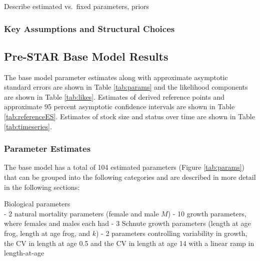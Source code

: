 \documentclass[11pt,
  english,
  a4paper,
]{article}
\begin{document}
\leavevmode\tagmcend\tagstructend

Describe estimated vs.~fixed parameters, priors


\hypertarget{key-assumptions-and-structural-choices}{%
\subsubsection{Key Assumptions and Structural Choices}\label{key-assumptions-and-structural-choices}}

\leavevmode\tagmcend\tagstructend


\hypertarget{pre-star-base-model-results}{%
\subsection{Pre-STAR Base Model Results}\label{pre-star-base-model-results}}

\leavevmode\tagmcend\tagstructend

The base model parameter estimates along with approximate asymptotic standard errors are shown in Table \ref{tab:params} and the likelihood components are shown in Table \ref{tab:likes}. Estimates of derived reference points and approximate 95 percent asymptotic confidence intervals are shown in Table \ref{tab:referenceES}. Estimates of stock size and status over time are shown in Table \ref{tab:timeseries}.


\hypertarget{parameter-estimates}{%
\subsubsection{Parameter Estimates}\label{parameter-estimates}}

\leavevmode\tagmcend\tagstructend

The base model has a total of 104 estimated parameters (Figure \ref{tab:params}) that can be grouped into the following categories and are described in more detail in the following sections:

Biological parameters\\
- 2 natural mortality parameters (female and male {\(M\)\leavevmode\tagmcend\tagstructend}) - 10 growth parameters, where females and males each had - 3 Schnute growth parameters (length at age frog, length at age frog, and {\(k\)\leavevmode\tagmcend\tagstructend}) - 2 parameters controlling variability in growth, the CV in length at age 0.5 and the CV in length at age 14 with a linear ramp in length-at-age
\end{document}
